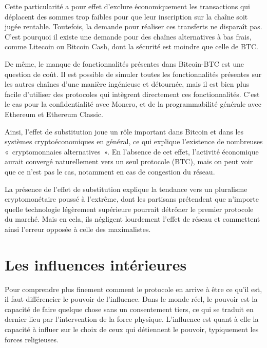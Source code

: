 Cette particularité a pour effet d'exclure économiquement les transactions qui déplacent des sommes trop faibles pour que leur inscription sur la chaîne soit jugée rentable. Toutefois, la demande pour réaliser ces transferts ne disparaît pas. C'est pourquoi il existe une demande pour des chaînes alternatives à bas frais, comme Litecoin ou Bitcoin Cash, dont la sécurité est moindre que celle de BTC.

De même, le manque de fonctionnalités présentes dans Bitcoin-BTC est une question de coût. Il est possible de simuler toutes les fonctionnalités présentes sur les autres chaînes d'une manière ingénieuse et détournée, mais il est bien plus facile d'utiliser des protocoles qui intègrent directement ces fonctionnalités. C'est le cas pour la confidentialité avec Monero, et de la programmabilité générale avec Ethereum et Ethereum Classic.

Ainsi, l'effet de substitution joue un rôle important dans Bitcoin et dans les systèmes cryptoéconomiques en général, ce qui explique l'existence de nombreuses «~cryptomonnaies alternatives~». En l'absence de cet effet, l'activité économique aurait convergé naturellement vers un seul protocole (BTC), mais on peut voir que ce n'est pas le cas, notamment en cas de congestion du réseau.


La présence de l'effet de substitution explique la tendance vers un pluralisme cryptomonétaire poussé à l'extrême, dont les partisans prétendent que n'importe quelle technologie légèrement supérieure pourrait détrôner le premier protocole du marché. Mais en cela, ils négligent lourdement l'effet de réseau et commettent ainsi l'erreur opposée à celle des maximalistes.

\section*{Les influences intérieures}

Pour comprendre plus finement comment le protocole en arrive à être ce qu'il est, il faut différencier le pouvoir de l'influence. Dans le monde réel, le pouvoir est la capacité de faire quelque chose sans un consentement tiers, ce qui se traduit en dernier lieu par l'intervention de la force physique. L'influence est quant à elle la capacité à influer sur le choix de ceux qui détiennent le pouvoir, typiquement les forces religieuses.

